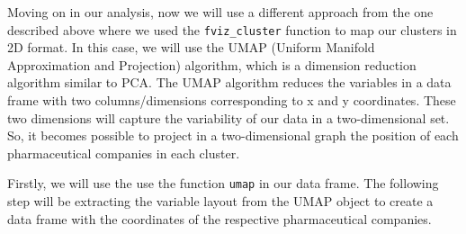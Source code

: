\documentclass[]{article}
\newenvironment{Shaded}{\begin{snugshade}}{\end{snugshade}}
\newcommand{\KeywordTok}[1]{\textcolor[rgb]{0.13,0.29,0.53}{\textbf{#1}}}
\newcommand{\DataTypeTok}[1]{\textcolor[rgb]{0.13,0.29,0.53}{#1}}
\newcommand{\StringTok}[1]{\textcolor[rgb]{0.31,0.60,0.02}{#1}}
\newcommand{\CommentTok}[1]{\textcolor[rgb]{0.56,0.35,0.01}{\textit{#1}}}
\newcommand{\OperatorTok}[1]{\textcolor[rgb]{0.81,0.36,0.00}{\textbf{#1}}}
\newcommand{\NormalTok}[1]{#1}
\begin{document}
Moving on in our analysis, now we will use a different approach from the
one described above where we used the \texttt{fviz\_cluster} function to
map our clusters in 2D format. In this case, we will use the UMAP
(Uniform Manifold Approximation and Projection) algorithm, which is a
dimension reduction algorithm similar to PCA. The UMAP algorithm reduces
the variables in a data frame with two columns/dimensions corresponding
to x and y coordinates. These two dimensions will capture the
variability of our data in a two-dimensional set. So, it becomes
possible to project in a two-dimensional graph the position of each
pharmaceutical companies in each cluster.

Firstly, we will use the use the function \texttt{umap} in our data
frame. The following step will be extracting the variable layout from
the UMAP object to create a data frame with the coordinates of the
respective pharmaceutical companies.

\begin{Shaded}
\end{Shaded}
\end{document}
